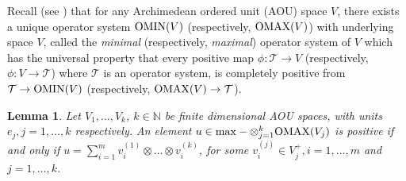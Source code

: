 \documentclass[11pt]{amsart}
\newtheorem{lemma}[theorem]{Lemma}
\newcommand{\cl}[1]{\mathcal{#1}}
\newcommand{\bb}[1]{\mathbb{#1}}
\begin{document}
Recall (see \cite{ptt}) that for any Archimedean ordered unit (AOU) space $V$, there exists a unique operator system ${\rm OMIN}(V)$ (respectively, ${\rm OMAX}(V)$) with underlying space $V$, called the \textit{minimal} (respectively, \textit{maximal}) operator system of $V$ which has the universal property that every positive map $\phi: \cl{T}\rightarrow V$ (respectively, $\phi: V\rightarrow \cl{T}$) where $\cl{T}$ is an operator system, is completely positive from $\cl{T} \rightarrow {\rm OMIN}(V)$ (respectively, ${\rm OMAX}(V)\rightarrow \cl{T}$). 
\begin{lemma}\label{omax_state_extension}
Let $V_{1}, \hdots, V_{k}$, $k \in \bb{N}$ be finite dimensional AOU spaces, with units $e_{j}, j = 1, \hdots, k$ respectively. An element $u \in {\rm max}-\otimes_{j=1}^{k}{\rm OMAX}(V_{j})$ is positive if and only if $u = \sum\limits_{i=1}^{m}v_{i}^{(1)}\otimes\hdots \otimes v_{i}^{(k)}$, for some $v_{i}^{(j)} \in V_{j}^{+}, i = 1, \hdots, m$ and $j = 1, \hdots, k$. 
\end{lemma}
\end{document}
